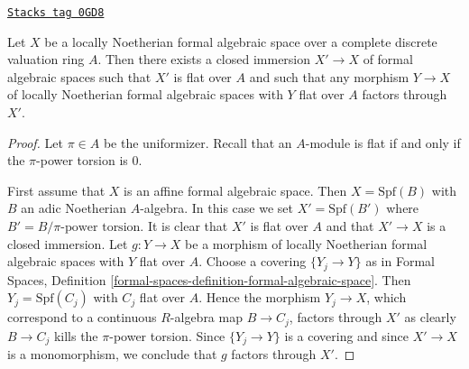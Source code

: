 \begin{lemma}
\label{restricted-lemma-flat-locus}
\href{https://stacks.math.columbia.edu/tag/0GD8}{\texttt{Stacks tag 0GD8}}

Let $X$ be a locally Noetherian formal algebraic space over
a complete discrete valuation ring $A$.
Then there exists a closed immersion $X' \to X$
of formal algebraic spaces such that $X'$ is flat over $A$
and such that any morphism $Y \to X$ of locally Noetherian formal algebraic
spaces with $Y$ flat over $A$ factors through $X'$.
\end{lemma}

\begin{proof}

Let $\pi \in A$ be the uniformizer. Recall that an $A$-module
is flat if and only if the $\pi$-power torsion is $0$.

\medskip\noindent
First assume that $X$ is an affine formal algebraic space.
Then $X = \text{Spf}(B)$ with $B$ an adic Noetherian $A$-algebra.
In this case we set $X' = \text{Spf}(B')$ where
$B' = B/\pi\text{-power torsion}$. It is clear that $X'$ is flat
over $A$ and that $X' \to X$ is a closed immersion.
Let $g : Y \to X$ be a morphism of locally Noetherian formal algebraic spaces
with $Y$ flat over $A$. Choose a covering $\{Y_j \to Y\}$ as in
Formal Spaces, Definition
\ref{formal-spaces-definition-formal-algebraic-space}.
Then $Y_j = \text{Spf}(C_j)$ with $C_j$ flat over $A$.
Hence the morphism $Y_j \to X$, which correspond to a continuous
$R$-algebra map $B \to C_j$, factors through $X'$ as clearly
$B \to C_j$ kills the $\pi$-power torsion.
Since $\{Y_j \to Y\}$ is a covering and since $X' \to X$
is a monomorphism, we conclude that $g$ factors through $X'$.


\end{proof}
